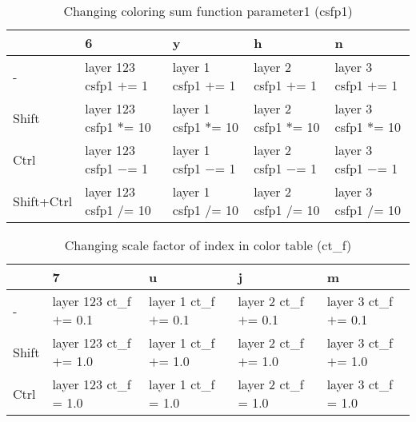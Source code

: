 \documentclass[10pt,a4paper]{article}
\begin{document}
\begin{table}[h!]
    \caption{Changing coloring sum function parameter1 (csfp1)}
    \setlength{\tabcolsep}{0.0pt}
    \begin{tabularx}{\linewidth}{LLLLL}
        \toprule
                   & 6                       & y                     & h                     & n                     \\
        \midrule
        -          & layer 123 csfp1 $+$= 1  & layer 1 csfp1 $+$= 1  & layer 2 csfp1 $+$= 1  & layer 3 csfp1 $+$= 1  \\
        Shift      & layer 123 csfp1 $*$= 10 & layer 1 csfp1 $*$= 10 & layer 2 csfp1 $*$= 10 & layer 3 csfp1 $*$= 10 \\
        Ctrl       & layer 123 csfp1 $-$= 1  & layer 1 csfp1 $-$= 1  & layer 2 csfp1 $-$= 1  & layer 3 csfp1 $-$= 1  \\
        Shift+Ctrl & layer 123 csfp1 $/$= 10 & layer 1 csfp1 $/$= 10 & layer 2 csfp1 $/$= 10 & layer 3 csfp1 $/$= 10 \\
        \bottomrule
    \end{tabularx}
\end{table}

\begin{table}[h!]
    \caption{Changing scale factor of index in color table (ct\_f)}
    \setlength{\tabcolsep}{0.0pt}
    \begin{tabularx}{\linewidth}{LLLLL}
        \toprule
                   & 7                        &  u                     & j                      & m                      \\
        \midrule
        -          & layer 123 ct\_f $+$= 0.1 & layer 1 ct\_f $+$= 0.1 & layer 2 ct\_f $+$= 0.1 & layer 3 ct\_f $+$= 0.1 \\
        Shift      & layer 123 ct\_f $+$= 1.0 & layer 1 ct\_f $+$= 1.0 & layer 2 ct\_f $+$= 1.0 & layer 3 ct\_f $+$= 1.0 \\
        Ctrl       & layer 123 ct\_f = 1.0    & layer 1 ct\_f = 1.0    & layer 2 ct\_f = 1.0    & layer 3 ct\_f = 1.0    \\
        \bottomrule
    \end{tabularx}
\end{table}
\end{document}
